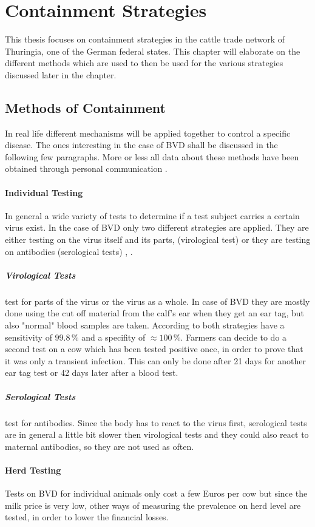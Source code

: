 \section{Containment Strategies}\label{chap:containmentBasics}
This thesis focuses on containment strategies in the cattle trade network of Thuringia, one of the German federal states. This chapter will elaborate on the different methods which are used to then be used for the various strategies discussed later in the chapter.

\subsection{Methods of Containment}
In real life different mechanisms will be applied together to control a specific disease. The ones interesting in the case of BVD shall be discussed in the following few paragraphs. More or less all data about these methods have been obtained through personal communication \citep{personalCom}.

\paragraph{Individual Testing}
In general a wide variety of tests to determine if a test subject carries a certain virus exist. In the case of BVD only two different strategies are applied. They are either testing on the virus itself and its parts, (virological test) or they are testing on antibodies (serological tests) \citep{haller1999diagnostik}, \citep{personalCom}. 

\subparagraph{Virological Tests} test for parts of the virus or the virus as a whole. In case of BVD they are mostly done using the cut off material from the calf's ear when they get an ear tag, but also "normal" blood samples are taken. According to \citep{personalCom} both strategies have a sensitivity of $99.8\,\%$ and a specifity of $\approx 100\,\%$. Farmers can decide to do a second test on a cow which has been tested positive once, in order to prove that it was only a transient infection. This can only be done after 21 days for another ear tag test or 42 days later after a blood test.

\subparagraph{Serological Tests} test for antibodies. Since the body has to react to the virus first, serological tests are in general a little bit slower then virological tests and they could also react to maternal antibodies, so they are not used as often.

\paragraph{Herd Testing}
Tests on BVD for individual animals only cost a few Euros per cow but since the milk price is very low, other ways of measuring the prevalence on herd level are tested, in order to lower the financial losses. 

